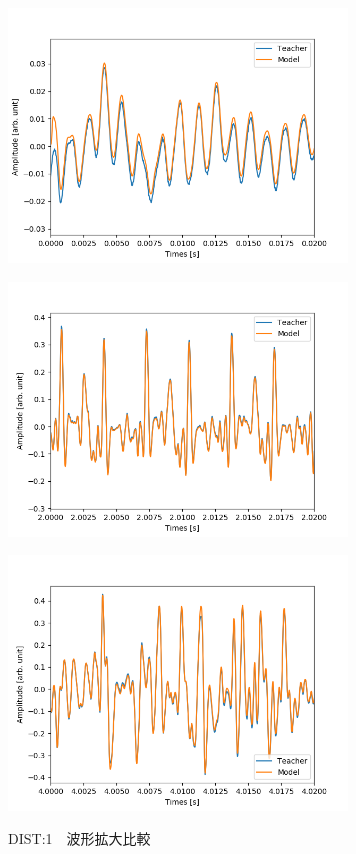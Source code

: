 \documentclass{jreport}		%
\begin{document}
\begin{figure}[htbp]
\begin{minipage}{0.5\hsize}
\begin{center}
 \end{center}
 \label{fig:one}
 \end{minipage}
 \begin{minipage}{0.5\hsize}
 \begin{center}
  \includegraphics[width=90mm]{gain1_output_hikaku4.png}
 \end{center}
 \label{fig:two}
 \end{minipage}
 \begin{minipage}{0.5\hsize}
 \begin{center}
  \includegraphics[width=90mm]{gain1_output_hikaku5.png}
 \end{center}
 \label{fig:one}
 \end{minipage}
 \begin{minipage}{0.5\hsize}
 \begin{center}
  \includegraphics[width=90mm]{gain1_output_hikaku6.png}
 \end{center}
 \label{fig:two}
 \end{minipage}
 \caption{DIST:1　波形拡大比較}
\end{figure}
\end{document}
